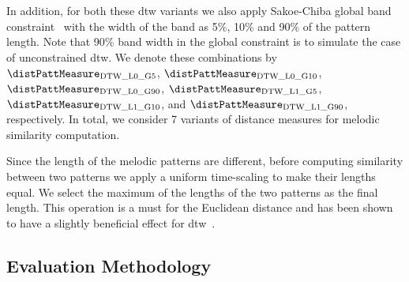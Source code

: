 In addition, for both these \gls{dtw} variants we also apply Sakoe-Chiba global band constraint~\citep{Sakoe78TASLP} with the width of the band as 5\%, 10\% and 90\% of the pattern length. Note that 90\% band width in the global constraint is to simulate the case of unconstrained \gls{dtw}. We denote these combinations by $\distPattMeasure_{\mathrm{DTW\_L0\_G5}}$, $\distPattMeasure_{\mathrm{DTW\_L0\_G10}}$, $\distPattMeasure_{\mathrm{DTW\_L0\_G90}}$, $\distPattMeasure_{\mathrm{DTW\_L1\_G5}}$, $\distPattMeasure_{\mathrm{DTW\_L1\_G10}}$, and $\distPattMeasure_{\mathrm{DTW\_L1\_G90}}$, respectively. In total, we consider 7 variants of distance measures for melodic similarity computation.

%

Since the length of the melodic patterns are different, before computing similarity between two patterns we apply a uniform time-scaling to make their lengths equal. We select the maximum of the lengths of the two patterns as the final length. This operation is a must for the Euclidean distance and has been shown to have a slightly beneficial effect for \gls{dtw}~\citep{Ratanamahatana2004,zhu2003query}.


\subsection{Evaluation Methodology}
\label{sec:patterns_melodic_similarity_evaluation_methodology}

